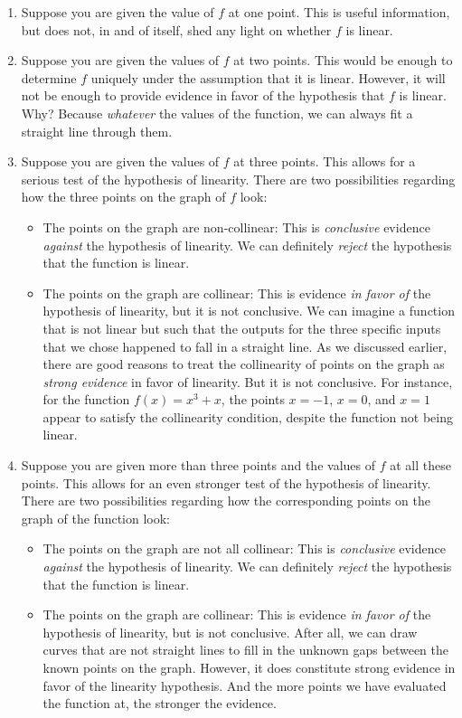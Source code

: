 \documentclass[10pt]{amsart}
\begin{document}
\begin{enumerate}
\item Suppose you are given the value of $f$ at one point. This is
  useful information, but does not, in and of itself, shed any light
  on whether $f$ is linear.
\item Suppose you are given the values of $f$ at two points. This
  would be enough to determine $f$ uniquely under the assumption that
  it is linear. However, it will not be enough to provide evidence in
  favor of the hypothesis that $f$ is linear. Why? Because {\em
    whatever} the values of the function, we can always fit a straight
  line through them.
\item Suppose you are given the values of $f$ at three points. This
  allows for a serious test of the hypothesis of linearity. There are
  two possibilities regarding how the three points on the graph of $f$
  look:

  \begin{itemize}
  \item The points on the graph are non-collinear: This is {\em conclusive}
    evidence {\em against} the hypothesis of linearity. We can
    definitely {\em reject} the hypothesis that the function is
    linear.
  \item The points on the graph are collinear: This is evidence {\em
    in favor of} the hypothesis of linearity, but it is not
    conclusive. We can imagine a function that is not linear but such
    that the outputs for the three specific inputs that we chose
    happened to fall in a straight line. As we discussed earlier,
    there are good reasons to treat the collinearity of points on the
    graph as {\em strong evidence} in favor of linearity. But it is
    not conclusive. For instance, for the function $f(x) = x^3 + x$,
    the points $x = -1$, $x = 0$, and $x = 1$ appear to satisfy the
    collinearity condition, despite the function not being linear.
  \end{itemize}

\item Suppose you are given more than three points and the values of
  $f$ at all these points. This allows for an even stronger test of
  the hypothesis of linearity. There are two possibilities regarding
  how the corresponding points on the graph of the function look:

  \begin{itemize}    
  \item The points on the graph are not all collinear: This is {\em
    conclusive} evidence {\em against} the hypothesis of linearity. We
    can definitely {\em reject} the hypothesis that the function is
    linear.
  \item The points on the graph are collinear: This is evidence {\em
    in favor of} the hypothesis of linearity, but is not
    conclusive. After all, we can draw curves that are not straight
    lines to fill in the unknown gaps between the known points on the
    graph. However, it does constitute strong evidence in favor of the
    linearity hypothesis. And the more points we have evaluated the
    function at, the stronger the evidence.
  \end{itemize}
\end{enumerate}
\end{document}
